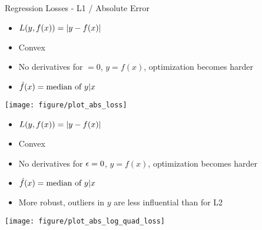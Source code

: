 \documentclass[11pt,compress,t,notes=noshow, xcolor=table]{beamer}
\newenvironment{knitrout}{}{} %
\begin{document}
\begin{vbframe}{Regression Losses - L1 / Absolute Error}
\begin{itemize}
\item $L(y, f(x)) = |y-f(x)|$
\item Convex
\item No derivatives for $ = 0$, $y = f(x)$, optimization becomes harder
\item $\hat{f}(x) = \text{median of } y | x$
\end{itemize}

\begin{knitrout}\scriptsize
{}\color{fgcolor}

{\centering \texttt{[image: figure/plot\_abs\_loss]} 

}



\end{knitrout}

\framebreak

\begin{itemize}
\item $L(y, f(x)) = |y-f(x)|$
\item Convex
\item No derivatives for $\epsilon = 0$, $y = f(x)$, optimization becomes harder
\item $\hat{f}(x) = \text{median of } y | x$
\item More robust, outliers in $y$ are less influential than for L2
\end{itemize}

\begin{knitrout}\scriptsize
{}\color{fgcolor}

{\centering \texttt{[image: figure/plot\_abs\_log\_quad\_loss]} 

}



\end{knitrout}

\end{vbframe}
\end{document}
